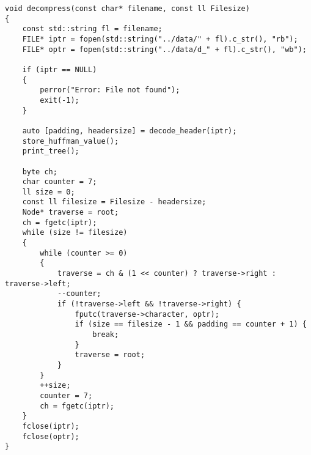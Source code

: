 \begin{lstlisting}[caption=Алгоритм разжатия файла]
void decompress(const char* filename, const ll Filesize)
{
	const std::string fl = filename;
	FILE* iptr = fopen(std::string("../data/" + fl).c_str(), "rb");
	FILE* optr = fopen(std::string("../data/d_" + fl).c_str(), "wb");
	
	if (iptr == NULL)
	{
		perror("Error: File not found");
		exit(-1);
	}
	
	auto [padding, headersize] = decode_header(iptr);
	store_huffman_value();
	print_tree();
	
	byte ch;
	char counter = 7;
	ll size = 0;
	const ll filesize = Filesize - headersize;
	Node* traverse = root;
	ch = fgetc(iptr);
	while (size != filesize)
	{
		while (counter >= 0)
		{
			traverse = ch & (1 << counter) ? traverse->right : traverse->left;
			--counter;
			if (!traverse->left && !traverse->right) {
				fputc(traverse->character, optr);
				if (size == filesize - 1 && padding == counter + 1) {
					break;
				}
				traverse = root;
			}
		}
		++size;
		counter = 7;
		ch = fgetc(iptr);
	}
	fclose(iptr);
	fclose(optr);
}
\end{lstlisting}